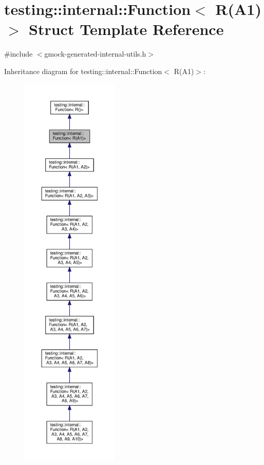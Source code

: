 \hypertarget{structtesting_1_1internal_1_1_function_3_01_r_07_a1_08_4}{}\section{testing\+:\+:internal\+:\+:Function$<$ R(A1)$>$ Struct Template Reference}
\label{structtesting_1_1internal_1_1_function_3_01_r_07_a1_08_4}


{\ttfamily \#include $<$gmock-\/generated-\/internal-\/utils.\+h$>$}



Inheritance diagram for testing\+:\+:internal\+:\+:Function$<$ R(A1)$>$\+:
\nopagebreak
\begin{figure}[H]
\begin{center}
\leavevmode
\includegraphics[height=550pt]{structtesting_1_1internal_1_1_function_3_01_r_07_a1_08_4__inherit__graph}
\end{center}
\end{figure}


